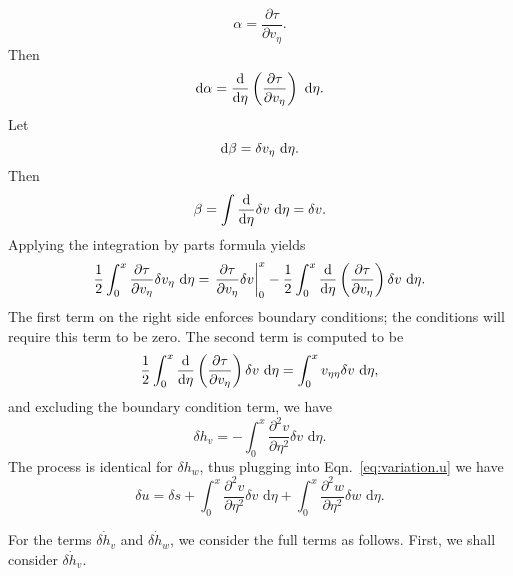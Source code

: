 \begin{equation}
\alpha = \frac{\partial \tau}{\partial v_\eta}.
\end{equation}
Then
\begin{equation}
\text d\alpha = \frac{\text d}{\text d\eta}\left(\frac{\partial \tau}{\partial v_\eta}\right)\text{ d}\eta.
\end{equation}
Let
\begin{equation}
\text d\beta = \delta v_\eta\text{ d}\eta.
\end{equation}
Then
\begin{equation}
\beta = \int \frac{\text d}{\text d\eta}\delta v\text{ d}\eta = \delta v.
\end{equation}
Applying the integration by parts formula yields
\begin{equation}
\frac{1}{2}\int_0^x \frac{\partial \tau}{\partial v_{\eta}}\delta v_{\eta}\text{ d}\eta = \left.\frac{\partial \tau}{\partial v_\eta}\delta v\right|_0^x - \frac{1}{2}\int_0^x\frac{\text d}{\text d\eta}\left(\frac{\partial \tau}{\partial v_\eta}\right)\delta v\text{ d}\eta.
\end{equation}
The first term on the right side enforces boundary conditions; the conditions will require this term to be zero. The second term is computed to be
\begin{equation}
\frac{1}{2}\int_0^x\frac{\text d}{\text d\eta}\left(\frac{\partial \tau}{\partial v_\eta}\right)\delta v\text{ d}\eta = \int_0^x v_{\eta\eta}\delta v\text{ d}\eta,
\end{equation}
and excluding the boundary condition term, we have
\begin{equation}
\delta h_v = -\int_0^x \frac{\partial^2 v}{\partial \eta^2}\delta v\text{ d}\eta.
\end{equation}
The process is identical for $\delta h_w$, thus plugging into Eqn.~\ref{eq:variation.u} we have
\begin{equation}
\delta u = \delta s + \int_0^x \frac{\partial^2 v}{\partial \eta^2}\delta v\text{ d}\eta + \int_0^x \frac{\partial^2 w}{\partial \eta^2}\delta w\text{ d}\eta.
\label{eq:variation.u.final}
\end{equation}

For the terms $\delta \dot h_v$ and $\delta \dot h_w$, we consider the full terms as follows. First, we shall consider $\delta\dot h_v$.

